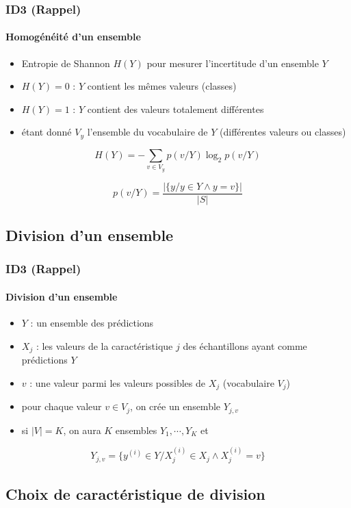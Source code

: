 \documentclass[xcolor=table]{beamer}
\begin{document}
\begin{frame}
	\frametitle{ID3 (Rappel)}
	\framesubtitle{Homogénéité d'un ensemble}
	
	\begin{itemize}
		\item Entropie de Shannon $H(Y)$ pour mesurer l'incertitude d'un ensemble $Y$
		\item $H(Y)=0$ : $Y$ contient les mêmes valeurs (classes)
		\item $H(Y)=1$ : $Y$ contient des valeurs totalement différentes
		\item étant donné $V_y$ l'ensemble du vocabulaire de $Y$ (différentes valeurs ou classes)
	\end{itemize}

	\[H(Y) = - \sum\limits_{v \in V_y} p(v/Y) \log_2 p(v/Y)\]
	
	\[p(v/Y) = \frac{|\{y / y \in Y \wedge y = v\}|}{|S|}\]
	
\end{frame}

\subsection{Division d'un ensemble}

\begin{frame}
	\frametitle{ID3 (Rappel)}
	\framesubtitle{Division d'un ensemble}
	
	\begin{itemize}
		\item $Y$ : un ensemble des prédictions 
		\item $X_j$ : les valeurs de la caractéristique $j$ des échantillons ayant comme prédictions $Y$
		\item $v$ : une valeur parmi les valeurs possibles de $X_j$ (vocabulaire $V_j$)
		\item pour chaque valeur $v \in V_j$, on crée un ensemble $Y_{j, v}$
		\item si $|V| = K$, on aura $K$ ensembles $Y_1, \cdots, Y_K$ et 
	\end{itemize}
	
	\[Y_{j,v} = \{y^{(i)} \in Y / X_j^{(i)} \in X_j \wedge X_j^{(i)} = v\}\]

	
\end{frame}

\subsection{Choix de caractéristique de division}
\end{document}
